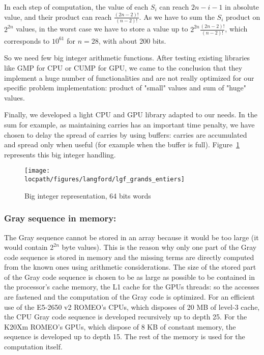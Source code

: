 In each step of computation, the value of each $S_i$ can reach $2n-i-1$ in absolute value, and their product can reach $\frac{(2n-2)!}{(n-2)!}$. 
As we have to sum the $S_i$ product on $2^{2n}$ values, in the worst case we have to store a value up to $2^{2n}\frac{(2n-2)!}{(n-2)!}$, which corresponds to $10^{61}$ for $n=28$, with about 200 bits.

So we need few big integer arithmetic functions. After testing existing libraries like GMP for CPU or CUMP for GPU, we came to the conclusion that they implement a huge number of functionalities and are not really optimized for our specific problem implementation: product of "small" values and sum of "huge" values. 

Finally, we developed a light CPU and GPU library adapted to our needs.
In the sum for example, as maintaining carries has an important time penalty, we have chosen to delay the spread of carries by using buffers: carries are accumulated and spread only when useful (for example when the buffer is full).
Figure~\ref{fig:big-integer} represents this big integer handling.
\begin{figure}[htbp]
\centering
\texttt{[image: \\locpath/figures/langford/lgf\_grands\_entiers]}
\caption{Big integer representation, 64 bits words}
\label{fig:big-integer}
\end{figure}


\subsubsection{Gray sequence in memory: }
The Gray sequence cannot be stored in an array because it would be too large (it would contain $2^{2n}$ byte values). This is the reason why only one part of the Gray code sequence is stored in memory and the missing terms are directly computed from the known ones using arithmetic considerations.
The size of the stored part of the Gray code sequence is chosen to be as large as possible to be contained in the processor's cache memory, the L1 cache for the GPUs threads: so the accesses are fastened and the computation of the Gray code is optimized.
For an efficient use of the E5-2650 v2 ROMEO's CPUs, which disposes of 20 MB of level-3 cache, the CPU Gray code sequence is developed recursively up to depth 25. For the K20Xm ROMEO's GPUs, which dispose of 8 KB of constant memory, the sequence is developed up to depth 15. The rest of the memory is used for the computation itself. 

